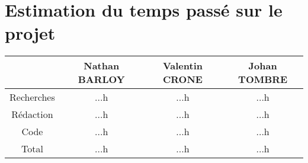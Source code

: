 \section{Estimation du temps passé sur le projet}
\begin{center}
\begin{tabular}{|c||c|c|c|}
	\hline
	& Nathan BARLOY & Valentin CRONE & Johan TOMBRE \\
	\hline
	Recherches & ...h & ...h & ...h \\
	\hline
	Rédaction & ...h & ...h & ...h \\
	\hline
	Code & ...h & ...h & ...h \\
	\hline
	\hline
	Total & ...h & ...h & ...h \\
	\hline
\end{tabular}
\end{center}
